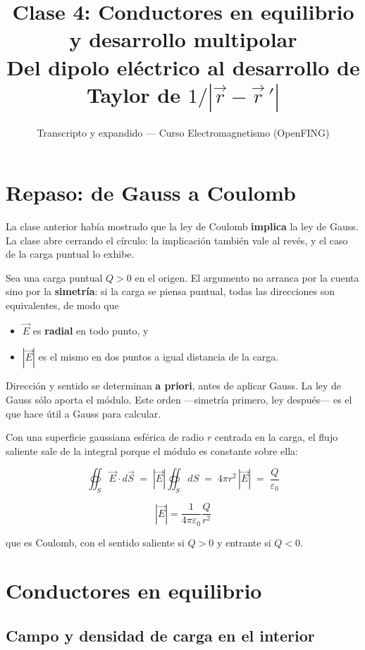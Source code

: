 \documentclass[12pt,a4paper]{article}
\title{\textbf{Clase 4: Conductores en equilibrio y desarrollo multipolar} \\[0.3em]
        \large{Del dipolo eléctrico al desarrollo de Taylor de $1/|\vec r-\vec r\,'|$}}
\author{Transcripto y expandido --- Curso Electromagnetismo (OpenFING)}
\date{}
\begin{document}
\maketitle
\thispagestyle{empty}
\newpage

\tableofcontents
\newpage

\section{Repaso: de Gauss a Coulomb}

La clase anterior había mostrado que la ley de Coulomb \textbf{implica} la ley de
Gauss. La clase abre cerrando el círculo: la implicación también vale al revés, y
el caso de la carga puntual lo exhibe.

Sea una carga puntual $Q>0$ en el origen. El argumento no arranca por la cuenta
sino por la \textbf{simetría}: si la carga se piensa puntual, todas las
direcciones son equivalentes, de modo que

\begin{itemize}[nosep]
  \item $\vec E$ es \textbf{radial} en todo punto, y
  \item $|\vec E|$ es el mismo en dos puntos a igual distancia de la carga.
\end{itemize}

\begin{notebox}
Dirección y sentido se determinan \textbf{a priori}, antes de aplicar Gauss. La
ley de Gauss sólo aporta el módulo. Este orden ---simetría primero, ley
después--- es el que hace útil a Gauss para calcular.
\end{notebox}

Con una superficie gaussiana esférica de radio $r$ centrada en la carga, el flujo
saliente sale de la integral porque el módulo es constante sobre ella:

\[
\oiint_S \vec E \cdot d\vec S \;=\; |\vec E| \oiint_S dS \;=\; 4\pi r^2\,|\vec E|
\;=\; \frac{Q}{\varepsilon_0}
\]

\[
\boxed{\;|\vec E| = \frac{1}{4\pi\varepsilon_0}\frac{Q}{r^2}\;}
\]

que es Coulomb, con el sentido saliente si $Q>0$ y entrante si $Q<0$.

\section{Conductores en equilibrio}

\subsection{Campo y densidad de carga en el interior}
\end{document}
